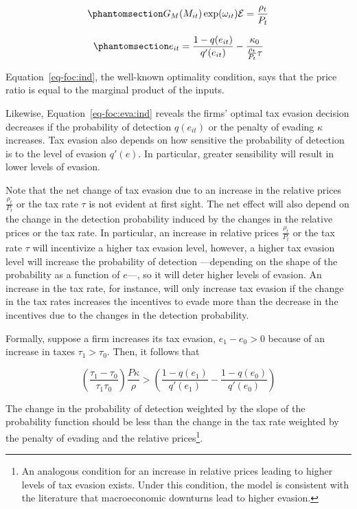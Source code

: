 \documentclass[
  12pt]{article}
\theoremstyle{definition}
\theoremstyle{remark}
\begin{document}
\begin{equation}\phantomsection\label{eq-foc:ind}{
G_M(M_{it})\exp(\omega_{it})\mathcal{E}=\frac{\rho_{t}}{P_t}
}\end{equation}

\begin{equation}\phantomsection\label{eq-foc:eva:ind}{
e_{it}=\frac{1-q(e_{it})}{q'(e_{it})}-\frac{\kappa_0}{\frac{\rho_{t}}{P_t}\tau}
}\end{equation}

Equation~\ref{eq-foc:ind}, the well-known optimality condition, says
that the price ratio is equal to the marginal product of the inputs.

Likewise, Equation~\ref{eq-foc:eva:ind} reveals the firms' optimal tax
evasion decision decreases if the probability of detection \(q(e_{it})\)
or the penalty of evading \(\kappa\) increases. Tax evasion also depends
on how sensitive the probability of detection is to the level of evasion
\(q'(e)\). In particular, greater sensibility will result in lower
levels of evasion.

Note that the net change of tax evasion due to an increase in the
relative prices \(\frac{\rho_{t}}{P_t}\) or the tax rate \(\tau\) is not
evident at first sight. The net effect will also depend on the change in
the detection probability induced by the changes in the relative prices
or the tax rate. In particular, an increase in relative prices
\(\frac{\rho_{t}}{P_t}\) or the tax rate \(\tau\) will incentivize a
higher tax evasion level, however, a higher tax evasion level will
increase the probability of detection ---depending on the shape of the
probability as a function of \(e\)---, so it will deter higher levels of
evasion. An increase in the tax rate, for instance, will only increase
tax evasion if the change in the tax rates increases the incentives to
evade more than the decrease in the incentives due to the changes in the
detection probability.

Formally, suppose a firm increases its tax evasion, \(e_1-e_0>0\)
because of an increase in taxes \(\tau_1>\tau_0\). Then, it follows that

\[
\left(\frac{\tau_1-\tau_0}{\tau_1\tau_0}\right)\frac{P\kappa}{\rho}>
  \left(\frac{1-q(e_1)}{q'(e_1)}-\frac{1-q(e_0)}{q'(e_0)}\right)
\]

The change in the probability of detection weighted by the slope of the
probability function should be less than the change in the tax rate
weighted by the penalty of evading and the relative prices\footnote{An
  analogous condition for an increase in relative prices leading to
  higher levels of tax evasion exists. Under this condition, the model
  is consistent with the literature that macroeconomic downturns lead to
  higher evasion.}.
\end{document}
